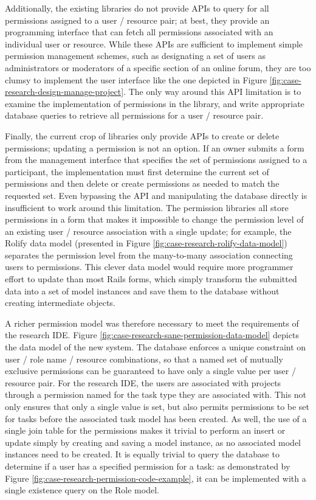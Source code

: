 \documentclass[document.tex]{subfiles}
\begin{document}
Additionally, the existing libraries do not provide APIs to query for all permissions assigned to a user / resource pair; at best, they provide an programming interface that can fetch all permissions associated with an individual user or resource.
While these APIs are sufficient to implement simple permission management schemes, such as designating a set of users as administrators or moderators of a specific section of an online forum, they are too clumsy to implement the user interface like the one depicted in Figure \ref{fig:case-research-design-manage-project}.
The only way around this API limitation is to examine the implementation of permissions in the library, and write appropriate database queries to retrieve all permissions for a user / resource pair.

Finally, the current crop of libraries only provide APIs to create or delete permissions; updating a permission is not an option.
If an owner submits a form from the management interface that specifies the set of permissions assigned to a participant, the implementation must first determine the current set of permissions and then delete or create permissions as needed to match the requested set.
Even bypassing the API and manipulating the database directly is insufficient to work around this limitation.
The permission libraries all store permissions in a form that makes it impossible to change the permission level of an existing user / resource association with a single update; for example, the Rolify data model (presented in Figure \ref{fig:case-research-rolify-data-model}) separates the permission level from the many-to-many association connecting users to permissions.
This clever data model would require more programmer effort to update than most Rails forms, which simply transform the submitted data into a set of model instances and save them to the database without creating intermediate objects.

A richer permission model was therefore necessary to meet the requirements of the research IDE.
Figure \ref{fig:case-research-sane-permission-data-model} depicts the data model of the new system.
The database enforces a unique constraint on user / role name / resource combinations, so that a named set of mutually exclusive permissions can be guaranteed to have only a single value per user / resource pair.
For the research IDE, the users are associated with projects through a permission named for the task type they are associated with.
This not only ensures that only a single value is set, but also permits permissions to be set for tasks before the associated task model has been created.
As well, the use of a single join table for the permissions makes it trivial to perform an insert or update simply by creating and saving a model instance, as no associated model instances need to be created.
It is equally trivial to query the database to determine if a user has a specified permission for a task: as demonstrated by Figure \ref{fig:case-research-permission-code-example}, it can be implemented with a single existence query on the Role model.
\end{document}
